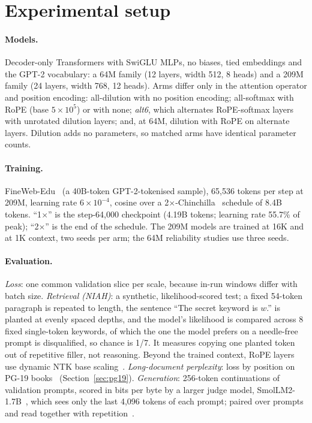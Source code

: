 \documentclass[11pt]{article}
\begin{document}
\section{Experimental setup}

\paragraph{Models.} Decoder-only Transformers with SwiGLU MLPs, no biases, tied embeddings and the
GPT-2 vocabulary: a 64M family (12 layers, width 512, 8 heads) and a 209M family (24 layers, width
768, 12 heads). Arms differ only in the attention operator and position encoding: all-dilution with
no position encoding; all-softmax with RoPE (base $5\times10^5$) or with none; \emph{alt6}, which
alternates RoPE-softmax layers with unrotated dilution layers; and, at 64M, dilution with RoPE on
alternate layers. Dilution adds no parameters, so matched arms have identical parameter counts.

\paragraph{Training.} FineWeb-Edu~\cite{fineweb} (a 40B-token GPT-2-tokenised sample), 65,536 tokens
per step at 209M, learning rate $6\times10^{-4}$, cosine over a 2$\times$-Chinchilla~\cite{chinchilla}
schedule of 8.4B tokens. ``1$\times$'' is the step-64,000 checkpoint (4.19B tokens; learning rate 55.7\%
of peak); ``2$\times$'' is the end of the schedule. The 209M models are trained at 16K and at 1K
context, two seeds per arm; the 64M reliability studies use three seeds.

\paragraph{Evaluation.} \emph{Loss}: one common validation slice per scale, because in-run windows
differ with batch size. \emph{Retrieval (NIAH)}: a synthetic, likelihood-scored test; a fixed
54-token paragraph is repeated to length, the sentence ``The secret keyword is $w$.'' is planted at
evenly spaced depths, and the model's likelihood is compared across 8 fixed single-token keywords,
of which the one the model prefers on a needle-free prompt is disqualified, so chance is 1/7. It
measures copying one planted token out of repetitive filler, not reasoning. Beyond the trained
context, RoPE layers use dynamic NTK base scaling~\cite{yarn}. \emph{Long-document perplexity}: loss
by position on PG-19 books~\cite{pg19} (Section~\ref{sec:pg19}). \emph{Generation}: 256-token
continuations of validation prompts, scored in bits per byte by a larger judge model,
SmolLM2-1.7B~\cite{smollm2}, which sees only the last 4,096 tokens of each prompt; paired over
prompts and read together with repetition~\cite{unlikelihood,nucleus}.
\end{document}
